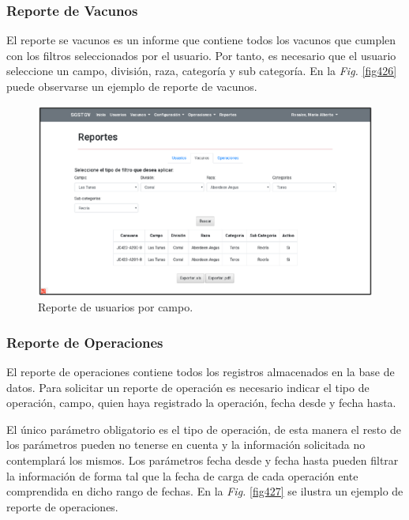 \documentclass[11pt,oneside]{book}
\begin{document}
\newpage
\subsubsection{Reporte de Vacunos}
El reporte se vacunos es un informe que contiene todos los vacunos que cumplen con los filtros seleccionados por el usuario. Por tanto, es necesario que el usuario seleccione un campo, división, raza, categoría y sub categoría. En la \textit{Fig.} \eqref{fig426} puede observarse un ejemplo de reporte de vacunos.
\begin{figure}[tbhp]
\centerline{\includegraphics[scale=0.87]{figs/capitulo_4_desarrollo/fig426.pdf}}
\caption{Reporte de usuarios por campo.}
\label{fig426}
\end{figure}

\subsubsection{Reporte de Operaciones}
El reporte de operaciones contiene todos los registros almacenados en la base de datos. Para solicitar un reporte de operación es necesario indicar el tipo de operación, campo, quien haya registrado la operación, fecha desde y fecha hasta.

El único parámetro obligatorio es el tipo de operación, de esta manera el resto de los parámetros pueden no tenerse en cuenta y la información solicitada no contemplará los mismos. Los parámetros fecha desde y fecha hasta pueden filtrar la información de forma tal que la fecha de carga de cada operación ente comprendida en dicho rango de fechas. En la \textit{Fig.} \eqref{fig427} se ilustra un ejemplo de reporte de operaciones.
\end{document}
